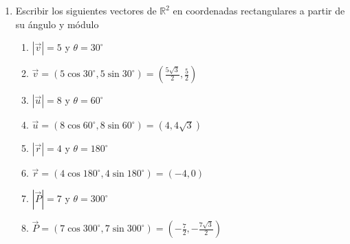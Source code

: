 \documentclass[a4paper]{article}
\newcommand{\answer}{\item[**]}
\newcommand{\exercise}{\item}
\newcommand{\SEL}[1]{ \left\{\begin{matrix} #1 \end{matrix}\right. }
\newcommand{\df}[2]{\displaystyle\frac{#1}{#2}}
\newcommand{\degs}{^{\circ}}
\begin{document}
\begin{enumerate}
\begin{multicols}{2}
\begin{enumerate} [label=(\alph*)]
		\item $(0,5)$
		\answer $|(0,5)| = \sqrt{0^2+5^2} = \sqrt{25} = 5$. $\theta= 90\degs$. $\SEL{v_x=5 \cos{90\degs} \\ v_y=5 \sin{90\degs} }$

		\item $(-2,1)$
		\answer $|(-2,1)| = \sqrt{(-2)^2+1^2} = \sqrt{5}$. $\theta=\arctan\left(\df{1}{-2}\right) +180\degs \simeq 153.43\degs$. $\SEL{v_x \simeq \sqrt{5} \cos{153\degs} \\ v_y \simeq \sqrt{5} \sin{153\degs} }$

		\item $(-3,-4)$
		\answer $|(-3,-4)| = \sqrt{(-3)^2+(-4)^2} = \sqrt{25} = 5$. $\theta=\arctan\left(\df{-4}{-3}\right) +180\degs \simeq 233.13\degs$. $\SEL{v_x \simeq 5 \cos{233\degs} \\ v_y \simeq 5 \sin{233\degs} }$

		\item $(-4,0)$
		\answer $|(-4,0)| = \sqrt{(-4)^2+0^2} = \sqrt{16} = 4$. $\theta= 180\degs$. $\SEL{v_x = 4 \cos{180\degs} \\ v_y = 4 \sin{180\degs} }$

		\item $(0,0)$
		\answer $|(0,0)| = \sqrt{0^2+0^2} = \sqrt{0} = 0$. No se define un ángulo. $\SEL{v_x = 0 \\ v_y= 0}$


	\end{enumerate}
	\end{multicols}

	\exercise Escribir los siguientes vectores de $\mathbb{R}^2$ en coordenadas rectangulares a partir de su ángulo y módulo
	\begin{multicols}{2}
	\begin{enumerate} [label=(\alph*)]
		
		\item $\left|\vec{v}\right|=5$ y $\theta=30\degs$
		\answer $\vec{v}=(5 \cos{30\degs}, 5 \sin{30\degs})=\left(\df{5\sqrt{3}}{2}, \df{5}{2}\right)$

		\item $\left|\vec{u}\right|=8$ y $\theta=60\degs$
		\answer $\vec{u}=(8 \cos{60\degs}, 8 \sin{60\degs})=( 4, 4\sqrt{3})$

		\item $\left|\vec{r}\right|=4$ y $\theta=180\degs$
		\answer $\vec{r}=(4 \cos{180\degs}, 4 \sin{180\degs})= (-4,0)$

		\item $\left|\vec{P}\right|=7$ y $\theta=300\degs$
		\answer $\vec{P}=(7 \cos{300\degs}, 7 \sin{300\degs})= \left(-\df{7}{2}, -\df{7\sqrt{3}}{2}\right)$


\end{enumerate}
\end{multicols}
\end{enumerate}
\end{document}
